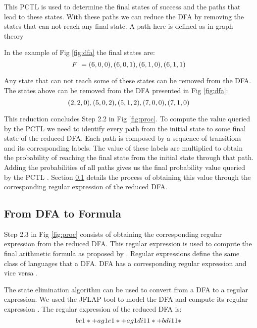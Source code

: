 \documentclass[conference]{IEEEtran}
\begin{document}
	This PCTL is used to determine the final states of success and
	the paths that lead to these states. With these paths we can reduce the DFA
	by removing the states that can not reach any final state. A path
	here is defined as in graph theory \cite{bondy}
	
	In the example of Fig \ref{fig:dfa} the final states are:
	\begin{equation}
	\footnotesize
	F\ = {(6,0,0),(6,0,1),(6,1,0),(6,1,1)}
	\end{equation}
	
	Any state that can not reach some of these states can be removed
	from the DFA. The states above can be removed from the DFA presented
	in Fig \ref{fig:dfa}:
	\begin{equation}
	\footnotesize
	{(2,2,0),(5,0,2),(5,1,2),(7,0,0),(7,1,0)}
	\end{equation}
		
	This reduction concludes Step 2.2 in Fig \ref{fig:proc}.
	To compute the value queried by the PCTL we need to 
	identify every path from the initial state to some final
	state of the reduced DFA. Each path is composed by a sequence
	of transitions and its corresponding labels. The value of these labels 
	are multiplied to obtain the probability of reaching the final
	state from the initial state through that path. Adding the probabilities
	of all paths gives us the final probability value queried by the PCTL \cite{marta}.
	Section \ref{sec:dfa2formula} details the process of obtaining this
	value through the corresponding regular expression of the reduced DFA.
	
		
\subsection{From  DFA to Formula}
\label{sec:dfa2formula}
		
		Step 2.3 in Fig \ref{fig:proc} consists of obtaining the corresponding
	regular expression from the reduced DFA. This regular expression 
	is used to compute the final arithmetic formula as proposed by \cite{daws}.		 
		Regular expressions define the same class of languages that a DFA.
	DFA has a corresponding regular expression and vice versa \cite{hopcroft}.
	
		The state elimination algorithm can be used to convert from a DFA to a regular expression.
	We used the JFLAP tool  to model the DFA and compute its regular expression \cite{jflap}. The
	regular expression of the reduced DFA is:
	\begin{equation}	
	\footnotesize
	be1*+ag1e1*+ag1di11*+bdi11*
	\end{equation}
	
\end{document}
